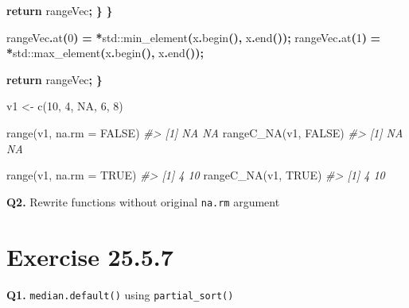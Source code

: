 \documentclass[
]{book}
\newenvironment{Shaded}{\begin{snugshade}}{\end{snugshade}}
\newcommand{\AttributeTok}[1]{\textcolor[rgb]{0.77,0.63,0.00}{#1}}
\newcommand{\BuiltInTok}[1]{#1}
\newcommand{\CommentTok}[1]{\textcolor[rgb]{0.56,0.35,0.01}{\textit{#1}}}
\newcommand{\ConstantTok}[1]{\textcolor[rgb]{0.00,0.00,0.00}{#1}}
\newcommand{\ControlFlowTok}[1]{\textcolor[rgb]{0.13,0.29,0.53}{\textbf{#1}}}
\newcommand{\DecValTok}[1]{\textcolor[rgb]{0.00,0.00,0.81}{#1}}
\newcommand{\FunctionTok}[1]{\textcolor[rgb]{0.00,0.00,0.00}{#1}}
\newcommand{\NormalTok}[1]{#1}
\newcommand{\OperatorTok}[1]{\textcolor[rgb]{0.81,0.36,0.00}{\textbf{#1}}}
\newcommand{\OtherTok}[1]{\textcolor[rgb]{0.56,0.35,0.01}{#1}}
\begin{document}
\begin{Shaded}
\begin{Highlighting}[]
            \ControlFlowTok{return}\NormalTok{ rangeVec}\OperatorTok{;}
        \OperatorTok{\}}
    \OperatorTok{\}}

\NormalTok{    rangeVec}\OperatorTok{.}\NormalTok{at}\OperatorTok{(}\DecValTok{0}\OperatorTok{)} \OperatorTok{=} \OperatorTok{*}\BuiltInTok{std::}\NormalTok{min\_element}\OperatorTok{(}\NormalTok{x}\OperatorTok{.}\NormalTok{begin}\OperatorTok{(),}\NormalTok{ x}\OperatorTok{.}\NormalTok{end}\OperatorTok{());}
\NormalTok{    rangeVec}\OperatorTok{.}\NormalTok{at}\OperatorTok{(}\DecValTok{1}\OperatorTok{)} \OperatorTok{=} \OperatorTok{*}\BuiltInTok{std::}\NormalTok{max\_element}\OperatorTok{(}\NormalTok{x}\OperatorTok{.}\NormalTok{begin}\OperatorTok{(),}\NormalTok{ x}\OperatorTok{.}\NormalTok{end}\OperatorTok{());}

    \ControlFlowTok{return}\NormalTok{ rangeVec}\OperatorTok{;}
\OperatorTok{\}}
\end{Highlighting}
\end{Shaded}

\begin{Shaded}
\begin{Highlighting}[]
\NormalTok{v1 }\OtherTok{\textless{}{-}} \FunctionTok{c}\NormalTok{(}\DecValTok{10}\NormalTok{, }\DecValTok{4}\NormalTok{, }\ConstantTok{NA}\NormalTok{, }\DecValTok{6}\NormalTok{, }\DecValTok{8}\NormalTok{)}

\FunctionTok{range}\NormalTok{(v1, }\AttributeTok{na.rm =} \ConstantTok{FALSE}\NormalTok{)}
\CommentTok{\#\textgreater{} [1] NA NA}
\FunctionTok{rangeC\_NA}\NormalTok{(v1, }\ConstantTok{FALSE}\NormalTok{)}
\CommentTok{\#\textgreater{} [1] NA NA}

\FunctionTok{range}\NormalTok{(v1, }\AttributeTok{na.rm =} \ConstantTok{TRUE}\NormalTok{)}
\CommentTok{\#\textgreater{} [1]  4 10}
\FunctionTok{rangeC\_NA}\NormalTok{(v1, }\ConstantTok{TRUE}\NormalTok{)}
\CommentTok{\#\textgreater{} [1]  4 10}
\end{Highlighting}
\end{Shaded}

\textbf{Q2.} Rewrite functions without original \texttt{na.rm} argument

\hypertarget{exercise-25.5.7}{%
\section{Exercise 25.5.7}\label{exercise-25.5.7}}

\textbf{Q1.} \texttt{median.default()} using \texttt{partial\_sort()}
\end{document}
